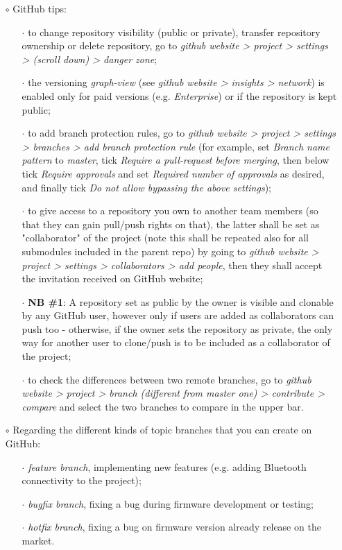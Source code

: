 \documentclass[a4paper,portrait,10pt]{article}   %
\newcommand{\mybulletlvA}{$\circ$}   %
\newcommand{\mybulletlvB}{$\cdot$}   %
\newcommand{\mysapo}[1]{\textquotesingle #1\textquotesingle }   %
\newcommand{\myvspace}{\vspace{4mm}}   %
\begin{document}
\begin{itemize}
\item[\mybulletlvA] GitHub tips:
\begin{itemize}
  \item[\mybulletlvB] to change repository visibility (public or private), transfer repository ownership or delete repository, go to \textit{github website > project > settings > (scroll down) > danger zone};
  \item[\mybulletlvB] the versioning \textit{graph-view} (see \textit{github website > insights > network}) is enabled only for paid versions (e.g. \textit{Enterprise}) or if the repository is kept public;
  \item[\mybulletlvB] to add branch protection rules, go to \textit{github website > project > settings > branches > add branch protection rule} (for example, set \textit{Branch name pattern} to \textit{master}, tick \textit{Require a pull-request before merging}, then below tick \textit{Require approvals} and set \textit{Required number of approvals} as desired, and finally tick  \textit{Do not allow bypassing the above settings});
  \item[\mybulletlvB] to give access to a repository you own to another team members (so that they can gain pull/push rights on that), the latter shall be set as "collaborator" of the project (note this shall be repeated also for all submodules included in the parent repo) by going to \textit{github website > project > settings > collaborators > add people}, then they shall accept the invitation received on GitHub website;
  \item[\mybulletlvB] \textbf{NB \#1}: A repository set as public by the owner is visible and clonable by any GitHub user, however only if users are added as collaborators can push too - otherwise, if the owner sets the repository as private, the only way for another user to clone/push is to be included as a collaborator of the project;
  \item[\mybulletlvB] to check the differences between two remote branches, go to \textit{github website > project > branch (different from \mysapo{master} one) > contribute > compare} and select the two branches to compare in the upper bar.
\end{itemize}
\myvspace

\item[\mybulletlvA] Regarding the different kinds of topic branches that you can create on GitHub:
\begin{itemize}
  \item[\mybulletlvB] \textit{feature branch}, implementing new features (e.g. adding Bluetooth connectivity to the project);
  \item[\mybulletlvB] \textit{bugfix branch}, fixing a bug during firmware development or testing;
  \item[\mybulletlvB] \textit{hotfix branch}, fixing a bug on firmware version already release on the market.
\end{itemize}
\end{itemize}
\myvspace
  
\end{document}
